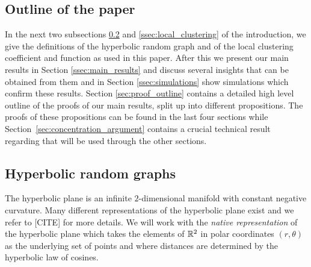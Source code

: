\subsection{Outline of the paper}

In the next two subsections \ref{ssec:hyperbolic_model} and \ref{ssec:local_clustering} of the introduction, we give the definitions of the hyperbolic random graph and of the local clustering coefficient and function as used in this paper. After this we present our main results in Section \ref{ssec:main_results} and discuss several insights that can be obtained from them and in Section \ref{ssec:simulations} show simulations which confirm these results. Section \ref{sec:proof_outline} contains a detailed high level outline of the proofs of our main results, split up into different propositions. The proofs of these propositions can be found in the last four sections while Section~\ref{sec:concentration_argument} contains a crucial technical result regarding that will be used through the other sections. 

\subsection{Hyperbolic random graphs}\label{ssec:hyperbolic_model}

The hyperbolic plane is an infinite $2$-dimensional manifold with constant negative curvature. Many different representations of the hyperbolic plane exist and we refer to [CITE] for more details.  We will work with the \emph{native representation} of the hyperbolic plane which takes the elements of ${\mathbb R}^2$ in polar coordinates $(r,\theta)$ as the underlying set of points and where distances are determined by the hyperbolic law of cosines.

